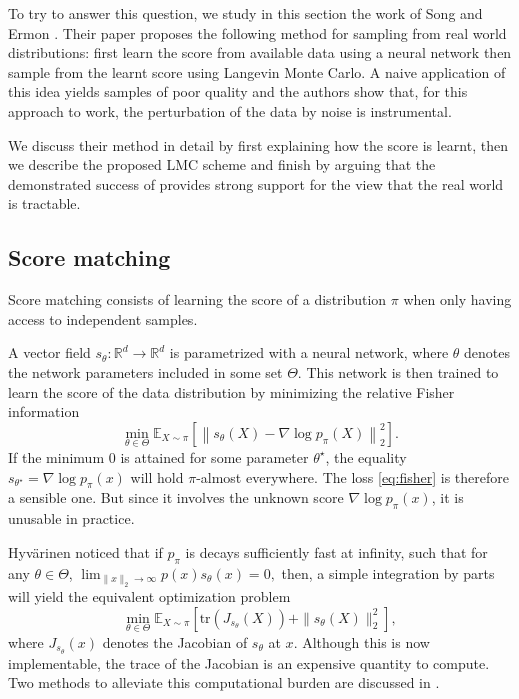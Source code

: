 \documentclass[11pt,twoside]{article}
\theoremstyle{definition}
\newcommand{\E}{\mathbb{E}}
\newcommand{\R}{\mathbb{R}}
\begin{document}
To try to answer this question, we study in this section the work of Song and Ermon \cite{song_generative_2019}. Their paper proposes the following method for sampling from real world distributions:  first learn the score from available data using a neural network then sample from the learnt score using Langevin Monte Carlo. A naive application of this idea yields samples of poor quality and the authors show that, for this approach to work, the perturbation of the data by noise is instrumental.

We discuss their method in detail by first explaining how the score is learnt, then we describe the proposed LMC scheme and finish by arguing that the demonstrated success of \cite{song_generative_2019} provides strong support for the view that the real world is tractable.

\subsection{Score matching}

Score matching consists of learning the score of a distribution $\pi$ when only having access to independent samples.

A vector field $s_\theta: \R^d \rightarrow \R^d$ is parametrized with a neural network, where $\theta$ denotes the network parameters included in some set $\Theta$. This network is then trained to learn the score of the data distribution by minimizing the relative Fisher information 
\begin{equation}
\min_{\theta \in \Theta} \E_{X \sim \pi} \left[ \left\| s_\theta(X) - \nabla \log p_\pi(X) \right\|_2^2\right].
\label{eq:fisher}
\end{equation}
If the minimum $0$ is attained for some parameter $\theta^\star$, the equality $s_{\theta^\star} = \nabla \log p_\pi(x)$ will hold $\pi$-almost everywhere. The loss \eqref{eq:fisher} is therefore a sensible one. But since it involves the unknown score $\nabla \log p_\pi(x)$, it is unusable in practice.

Hyv\"arinen \cite{hyvarinen_estimation_2005} noticed that if $p_\pi$ is decays sufficiently fast at infinity, such that for any $\theta \in \Theta$,
\(
 \lim_{\|x\|_2 \rightarrow \infty} p(x)s_\theta(x) =0,
\)
then, a simple integration by parts will yield the equivalent optimization problem
\begin{equation}
\min_{\theta \in \Theta} \E_{X \sim \pi} \left[ \text{tr}(J_{s_\theta}(X)) + \|s_\theta(X)\|_2^2\right],
\label{eq:tractable-score}
\end{equation}
where $J_{s_\theta}(x)$ denotes the Jacobian of $s_\theta$ at $x$. Although this is now implementable, the trace of the Jacobian is an expensive quantity to compute. Two methods to alleviate this computational burden are discussed in \cite{song_generative_2019}.
\end{document}
